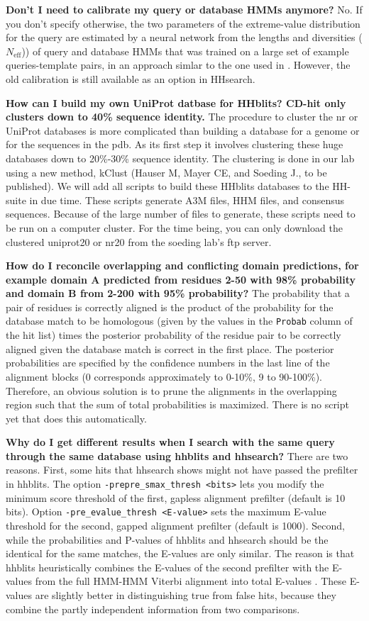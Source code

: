 \documentclass[11pt,a4paper]{article}
\begin{document}
{\bf Don't I need to calibrate my query or database HMMs anymore?}
No. If you don't specify otherwise, the two parameters of the extreme-value distribution for the query are estimated by a neural network from the lengths and diversities ($N_\mathrm{eff}$)) of query and database HMMs that was trained on a large set of example queries-template pairs, in an approach simlar to the one used in \cite{Sadreyev:2008}. However, the old calibration is still available as an option in HHsearch.

{\bf How can I build my own UniProt datbase for HHblits? CD-hit only clusters down to 40\% sequence identity.}
The procedure to cluster the nr or UniProt databases is more complicated than building a database for a genome or for the sequences in the pdb. As its first step it involves clustering these huge databases down to 20\%-30\% sequence identity. The clustering is done in our lab using a new method, kClust (Hauser M, Mayer CE, and Soeding J., to be published). We will add all scripts to build these HHblits databases to the HH-suite in due time. These scripts generate A3M files, HHM files, and consensus sequences. Because of the large number of files to generate, these scripts need to be run on a computer cluster. For the time being, you can only download the clustered uniprot20 or nr20 from the soeding lab's ftp server.

{\bf How do I reconcile overlapping and conflicting domain predictions, for example domain A predicted from residues 2-50 with 98\% probability and domain B from 2-200 with 95\% probability?} The probability that a pair of residues is correctly aligned is the product of the probability for the database match to be homologous (given by the values in the \verb`Probab` column of the hit list) times the posterior probability of the residue pair to be correctly aligned given the database match is correct in the first place. The posterior probabilities are specified by the confidence numbers in the last line of the alignment blocks (0 corresponds approximately to 0-10\%, 9 to 90-100\%). Therefore, an obvious solution is to prune the alignments in the overlapping region such that the sum of total probabilities is maximized. There is no script yet that does this automatically.

{\bf Why do I get different results when I search with the same query through the same database using hhblits and hhsearch?} There are two reasons. First, some hits that hhsearch shows might not have passed the prefilter in hhblits. The option \verb`-prepre_smax_thresh <bits>` lets you modify the minimum score threshold of the first, gapless alignment prefilter (default is 10 bits). Option \verb`-pre_evalue_thresh <E-value>` sets the maximum E-value threshold for the second, gapped alignment prefilter (default is 1000). Second, while the probabilities and P-values of hhblits and hhsearch should be the identical for the same matches, the E-values are only similar. The reason is that hhblits heuristically combines the E-values of the second prefilter with the E-values from the full HMM-HMM Viterbi alignment into total E-values \cite{Remmert:2011}. These E-values are slightly better in distinguishing true from false hits, because they combine the partly independent information from two comparisons.
\end{document}
